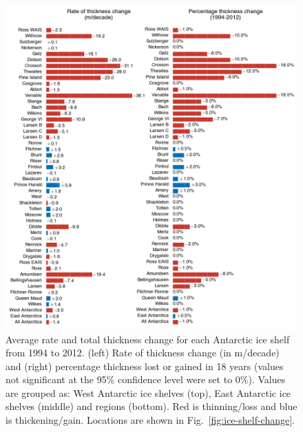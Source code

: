 \begin{figure}[!h]
  \centering
  \includegraphics[width=\textwidth]{img/Sup2_barchart1_review_v7.png}
  \caption[Average rate and total thickness change for each Antarctic]{
  \ssp \footnotesize
  Average rate and total thickness change for each Antarctic ice shelf from 1994 to 2012. (left) Rate of thickness change (in m/decade) and (right) percentage thickness lost or gained in 18 years (values not significant at the 95\% confidence level were set to 0\%). Values are grouped as: West Antarctic ice shelves (top), East Antarctic ice shelves (middle) and regions (bottom). Red is thinning/loss and blue is thickening/gain. Locations are shown in Fig.~\ref{fig:ice-shelf-change}.
  }
  \label{c3f6}
\end{figure}


